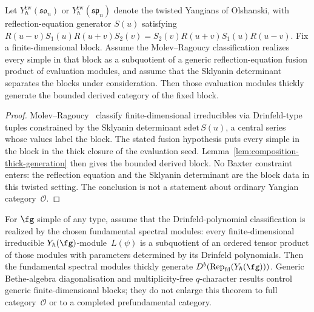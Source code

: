 \begin{proposition}
\label{prop:mc3-reflection-equation}
Let $Y^{\mathrm{tw}}_\hbar(\mathfrak{so}_n)$ or
$Y^{\mathrm{tw}}_\hbar(\mathfrak{sp}_n)$ denote the twisted
Yangians of Olshanski, with reflection-equation generator
$S(u)$ satisfying $R(u-v) S_1(u) R(u+v) S_2(v) = S_2(v)
R(u+v) S_1(u) R(u-v)$. Fix a finite-dimensional block. Assume the
Molev--Ragoucy classification realizes every simple in that block as
a subquotient of a generic reflection-equation fusion product of
evaluation modules, and assume that the Sklyanin determinant separates
the blocks under consideration. Then those evaluation modules thickly
generate the bounded derived category of the fixed block.
\end{proposition}

\begin{proof}
Molev--Ragoucy~\cite{MolevRagoucy02} classify finite-dimensional
irreducibles via Drinfeld-type tuples constrained by the
Sklyanin determinant $\mathrm{sdet}\, S(u)$, a central series
whose values label the block. The stated fusion hypothesis puts every
simple in the block in the thick closure of the evaluation seed.
Lemma~\ref{lem:composition-thick-generation} then gives the bounded
derived block. No Baxter constraint enters: the reflection equation
and the Sklyanin determinant are the block data in this twisted
setting. The conclusion is not a statement about ordinary Yangian
category~$\mathcal O$.
\end{proof}

\begin{theorem}
\label{thm:mc3-universal-multiplicity-free}
For $\fg$ simple of any type, assume that the Drinfeld-polynomial
classification is realized by the chosen fundamental spectral modules:
every finite-dimensional irreducible
$Y_\hbar(\fg)$-module~$L(\psi)$ is a subquotient of an ordered tensor
product of those modules with parameters determined by its Drinfeld
polynomials. Then the fundamental spectral modules thickly generate
$D^b(\operatorname{Rep}_{\mathrm{fd}}(Y_\hbar(\fg)))$.
Generic Bethe-algebra diagonalisation and multiplicity-free
$q$-character results control generic finite-dimensional blocks; they
do not enlarge this theorem to full category~$\mathcal O$ or to a
completed prefundamental category.
\end{theorem}

